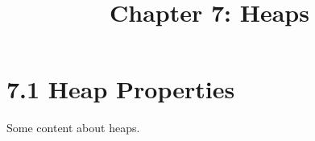 \documentclass{article}
\title{Chapter 7: Heaps}
\begin{document}
\section{7.1 Heap Properties}
Some content about heaps.
\end{document}
